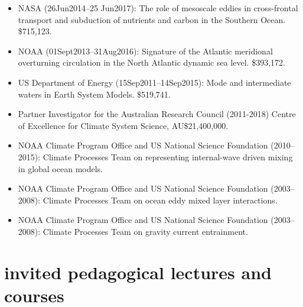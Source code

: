 \documentclass{article}
\begin{document}
\begin{itemize}[leftmargin=*]
\item NASA (26Jun2014--25 Jun2017): The role of mesoscale eddies in
  cross-frontal transport and subduction of nutrients and carbon in
  the Southern Ocean.  \$715,123.

\item NOAA (01Sept2013--31Aug2016): Signature of the Atlantic
  meridional overturning circulation in the North Atlantic dynamic sea
  level.  \$393,172.

\item US Department of Energy (15Sep2011--14Sep2015): Mode and
  intermediate waters in Earth System Models. \$519,741.

\item Partner Investigator for the Australian Research Council (2011-2018) Centre of Excellence for Climate System Science, AU\$21,400,000.
  
\item NOAA Climate Program Office and US National Science Foundation
  (2010--2015): Climate Processes Team on representing internal-wave
  driven mixing in global ocean models.

\item NOAA Climate Program Office and US National Science Foundation
  (2003--2008): Climate Processes Team on ocean eddy mixed layer
  interactions.

\item NOAA Climate Program Office and US National Science Foundation
  (2003--2008): Climate Processes Team on gravity current entrainment.



\end{itemize}


\section*{\sc  \color{Maroon}  invited pedagogical lectures and courses}
\vspace{-.3cm}
\end{document}
